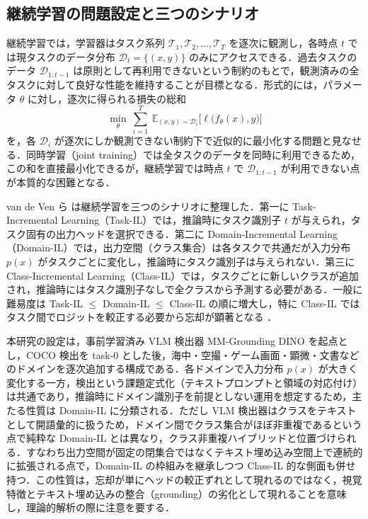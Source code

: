 \subsection{継続学習の問題設定と三つのシナリオ}

継続学習では，学習器はタスク系列 $\mathcal{T}_1,\mathcal{T}_2,\ldots,\mathcal{T}_T$ を逐次に観測し，各時点 $t$ では現タスクのデータ分布 $\mathcal{D}_t=\{(x,y)\}$ のみにアクセスできる．過去タスクのデータ $\mathcal{D}_{1:t-1}$ は原則として再利用できないという制約のもとで，観測済みの全タスクに対して良好な性能を維持することが目標となる．形式的には，パラメータ $\theta$ に対し，逐次に得られる損失の総和
\begin{equation}
\min_{\theta}\ \sum_{i=1}^{T}\ \mathbb{E}_{(x,y)\sim\mathcal{D}_i}\bigl[\ell\bigl(f_\theta(x),y\bigr)\bigr]
\end{equation}
を，各 $\mathcal{D}_i$ が逐次にしか観測できない制約下で近似的に最小化する問題と見なせる．同時学習（joint training）では全タスクのデータを同時に利用できるため，この和を直接最小化できるが，継続学習では時点 $t$ で $\mathcal{D}_{1:t-1}$ が利用できない点が本質的な困難となる．

van de Ven ら \cite{threescenarios} は継続学習を三つのシナリオに整理した．第一に Task-Incremental Learning（Task-IL）では，推論時にタスク識別子 $t$ が与えられ，タスク固有の出力ヘッドを選択できる．第二に Domain-Incremental Learning（Domain-IL）では，出力空間（クラス集合）は各タスクで共通だが入力分布 $p(x)$ がタスクごとに変化し，推論時にタスク識別子は与えられない．第三に Class-Incremental Learning（Class-IL）では，タスクごとに新しいクラスが追加され，推論時にはタスク識別子なしで全クラスから予測する必要がある．一般に難易度は Task-IL $\leq$ Domain-IL $\leq$ Class-IL の順に増大し，特に Class-IL ではタスク間でロジットを較正する必要から忘却が顕著となる \cite{clsurvey}．

本研究の設定は，事前学習済み VLM 検出器 MM-Grounding DINO を起点とし，COCO 検出を task-0 とした後，海中・空撮・ゲーム画面・顕微・文書などのドメインを逐次追加する構成である．各ドメインで入力分布 $p(x)$ が大きく変化する一方，検出という課題定式化（テキストプロンプトと領域の対応付け）は共通であり，推論時にドメイン識別子を前提としない運用を想定するため，主たる性質は Domain-IL に分類される．ただし VLM 検出器はクラスをテキストとして開語彙的に扱うため，ドメイン間でクラス集合がほぼ非重複であるという点で純粋な Domain-IL とは異なり，クラス非重複ハイブリッドと位置づけられる．すなわち出力空間が固定の閉集合ではなくテキスト埋め込み空間上で連続的に拡張される点で，Domain-IL の枠組みを継承しつつ Class-IL 的な側面も併せ持つ．この性質は，忘却が単にヘッドの較正ずれとして現れるのではなく，視覚特徴とテキスト埋め込みの整合（grounding）の劣化として現れることを意味し，理論的解析の際に注意を要する．

